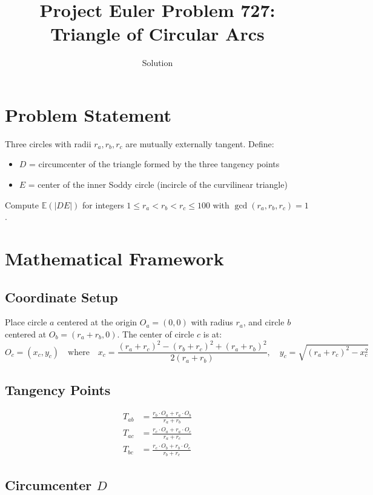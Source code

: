 \documentclass[12pt]{article}
\title{Project Euler Problem 727: Triangle of Circular Arcs}
\author{Solution}
\date{}
\begin{document}
\maketitle

\section{Problem Statement}

Three circles with radii $r_a, r_b, r_c$ are mutually externally tangent. Define:
\begin{itemize}
\item $D$ = circumcenter of the triangle formed by the three tangency points
\item $E$ = center of the inner Soddy circle (incircle of the curvilinear triangle)
\end{itemize}

Compute $\mathbb{E}(|DE|)$ for integers $1 \leq r_a < r_b < r_c \leq 100$ with $\gcd(r_a, r_b, r_c) = 1$.

\section{Mathematical Framework}

\subsection{Coordinate Setup}

Place circle $a$ centered at the origin $O_a = (0, 0)$ with radius $r_a$, and circle $b$ centered at $O_b = (r_a + r_b, 0)$. The center of circle $c$ is at:
\[
O_c = (x_c, y_c) \quad \text{where} \quad x_c = \frac{(r_a+r_c)^2 - (r_b+r_c)^2 + (r_a+r_b)^2}{2(r_a+r_b)}, \quad y_c = \sqrt{(r_a+r_c)^2 - x_c^2}
\]

\subsection{Tangency Points}

\begin{align}
T_{ab} &= \frac{r_b \cdot O_a + r_a \cdot O_b}{r_a + r_b} \\
T_{ac} &= \frac{r_c \cdot O_a + r_a \cdot O_c}{r_a + r_c} \\
T_{bc} &= \frac{r_c \cdot O_b + r_b \cdot O_c}{r_b + r_c}
\end{align}

\subsection{Circumcenter $D$}
\end{document}
